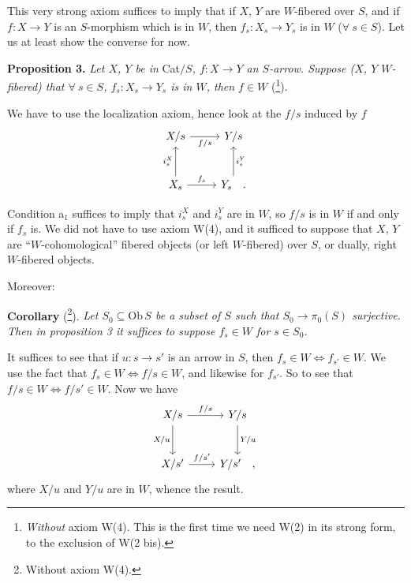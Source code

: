 \documentclass[11pt]{article}
\newcommand{\printedpage}[1]{\marginpar{\footnotesize p.~#1}}
\newcommand{\msp}[1]{\marginpar{\footnotesize [#1]}}
\begin{document}
This very strong axiom suffices to imply that if $X$, $Y$ are $W$-fibered over $S$, and if $f : X \longrightarrow Y$ is an $S$-morphism which is in $W$, then $f_s : X_s \longrightarrow Y_s$ is in $W$ ($\forall\ s \in S$). Let us at least show the converse for now.

\msp{page 6}

\textbf{Proposition 3.} \textit{Let $X$, $Y$ be in} Cat$/S$\textit{, $f : X \longrightarrow Y$ an $S$-arrow. Suppose ($X$, $Y$ $W$-fibered) that $\forall\ s \in S$, $f_s : X_s \longrightarrow Y_s$ is in $W$, then $f \in W$} (\footnote[8]{\textit{Without} axiom W(4). This is the first time we need W(2) in its strong form, to the exclusion of W(2 bis).}).

We have to use the localization axiom, hence look at the $f/s$ induced by $f$
\printedpage{6}
\[
\begin{tikzcd}[row sep=large]
X/s \arrow[r, "f/s"'] & Y/s \\
X_s \arrow[u, "i_s^X"] \arrow[r, "f_s"] & Y_s \arrow[u, "i_s^Y"'] \quad .
\end{tikzcd}
\]

Condition a$_1$ suffices to imply that $i_s^X$ and $i_s^Y$ are in $W$, so $f/s$ is in $W$ if and only if $f_s$ is. We did not have to use axiom W(4), and it sufficed to suppose that $X$, $Y$ are ``$W$-cohomological'' fibered objects (or left $W$-fibered) over $S$, or dually, right $W$-fibered objects.

Moreover:

\textbf{Corollary} (\footnote[9]{Without axiom W(4).}). \textit{Let $S_0 \subseteq \mathrm{Ob}\,S$ be a subset of $S$ such that $S_0 \longrightarrow \pi_0(S)$ surjective. Then in proposition 3 it suffices to suppose $f_s \in W$ for $s \in S_0$.}

It suffices to see that if $u : s \longrightarrow s'$ is an arrow in $S$, then $f_s \in W \iff f_{s'} \in W$. We use the fact that $f_s \in W \iff f/s \in W$, and likewise for $f_{s'}$. So to see that $f/s \in W \iff f/s' \in W$. Now we have
\[
\begin{tikzcd}[row sep=large]
X/s \arrow[r, "f/s"] \arrow[d, "X/u"'] & Y/s \arrow[d, "Y/u"] \\
X/s' \arrow[r, "f/s'"] & Y/s' \quad ,
\end{tikzcd}
\]
where $X/u$ and $Y/u$ are in $W$, whence the result.
\end{document}
